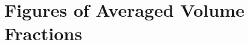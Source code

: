\documentclass[12pt]{article}
\begin{document}



\pagebreak

\section{Figures of Averaged Volume Fractions}\label{sec:Vol_Frac_Figs}
\end{document}
